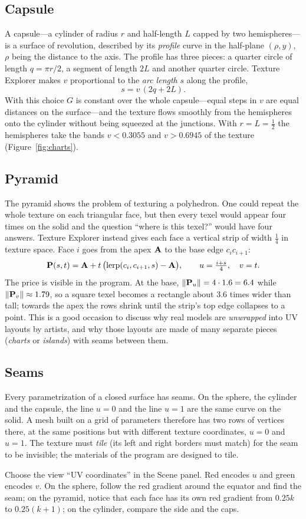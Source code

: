 \subsection{Capsule}
A capsule---a cylinder of radius $r$ and half-length $L$ capped by two hemispheres---is a
surface of revolution, described by its \emph{profile} curve in the half-plane $(\rho,y)$,
$\rho$ being the distance to the axis. The profile has three pieces: a quarter circle of length
$q=\pi r/2$, a segment of length $2L$ and another quarter circle. Texture Explorer makes $v$
proportional to the \emph{arc length} $s$ along the profile,
\[
  s = v\,(2q + 2L).
\]
With this choice $G$ is constant over the whole capsule---equal steps in $v$ are equal distances
on the surface---and the texture flows smoothly from the hemispheres onto the cylinder without
being squeezed at the junctions. With $r=L=\frac12$ the hemispheres take the bands
$v<0.3055$ and $v>0.6945$ of the texture (Figure~\ref{fig:charts}).

\subsection{Pyramid}
The pyramid shows the problem of texturing a polyhedron. One could repeat the whole texture on
each triangular face, but then every texel would appear four times on the solid and the
question ``where is this texel?'' would have four answers. Texture Explorer instead gives
each face a vertical strip of width $\frac14$ in texture space. Face $i$ goes from the apex
$\mathbf{A}$ to the base edge $c_i c_{i+1}$:
\[
  \mathbf{P}(s,t) = \mathbf{A} + t\,\bigl(\mathrm{lerp}(c_i,c_{i+1},s)-\mathbf{A}\bigr),\qquad
  u = \tfrac{i+s}{4},\quad v=t .
\]
The price is visible in the program. At the base, $\lVert\mathbf{P}_u\rVert = 4\cdot1.6 = 6.4$
while $\lVert\mathbf{P}_v\rVert\approx1.79$, so a square texel becomes a rectangle about $3.6$
times wider than tall; towards the apex the rows shrink until the strip's top edge collapses
to a point. This is a good
occasion to discuss why real models are \emph{unwrapped} into UV layouts by artists, and why
those layouts are made of many separate pieces (\emph{charts} or \emph{islands}) with seams
between them.

\subsection{Seams}
Every parametrization of a closed surface has seams. On the sphere, the cylinder and the
capsule, the line $u=0$ and the line $u=1$ are the same curve on the solid. A mesh built on a
grid of parameters therefore has two rows of vertices there, at the same positions but with
different texture coordinates, $u=0$ and $u=1$. The texture must \emph{tile} (its left and
right borders must match) for the seam to be invisible; the materials of the program are
designed to tile.

\begin{tryit}
Choose the view ``UV coordinates'' in the Scene panel. Red encodes $u$ and green encodes $v$.
On the sphere, follow the red gradient around the equator and find the seam; on the pyramid,
notice that each face has its own red gradient from $0.25k$ to $0.25(k+1)$; on the cylinder,
compare the side and the caps.
\end{tryit}
